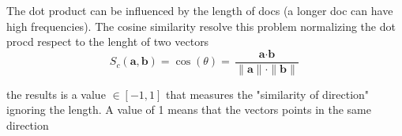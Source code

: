 

The dot product can be influenced by the length of docs (a longer doc can have high frequencies). The cosine similarity resolve this problem normalizing the dot procd respect to the lenght of two vectors
\[
    S_c (\textbf{a}, \textbf{b}) = \cos(\theta) = \frac{\textbf{a}\cdot\textbf{b}}{\|\textbf{a}\|\cdot\|\textbf{b}\|}
\]

the results is a value $\in[-1,1]$ that measures the "similarity of direction" ignoring the length. A value of 1 means that the vectors points in the same direction



